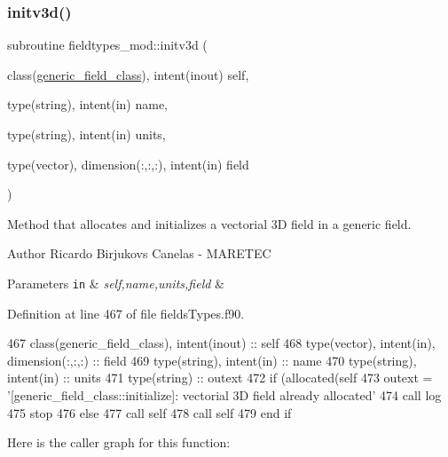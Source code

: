 \subsubsection{\texorpdfstring{initv3d()}{initv3d()}}
{\footnotesize\ttfamily subroutine fieldtypes\+\_\+mod\+::initv3d (\begin{DoxyParamCaption}\item[{class(\mbox{\hyperlink{structfieldtypes__mod_1_1generic__field__class}{generic\+\_\+field\+\_\+class}}), intent(inout)}]{self,  }\item[{type(string), intent(in)}]{name,  }\item[{type(string), intent(in)}]{units,  }\item[{type(vector), dimension(\+:,\+:,\+:), intent(in)}]{field }\end{DoxyParamCaption})\hspace{0.3cm}{\ttfamily [private]}}



Method that allocates and initializes a vectorial 3D field in a generic field. 

\begin{DoxyAuthor}{Author}
Ricardo Birjukovs Canelas -\/ M\+A\+R\+E\+T\+EC 
\end{DoxyAuthor}

\begin{DoxyParams}[1]{Parameters}
\mbox{\tt in}  & {\em self,name,units,field} & \\
\hline
\end{DoxyParams}


Definition at line 467 of file fields\+Types.\+f90.


\begin{DoxyCode}
467     \textcolor{keywordtype}{class}(generic\_field\_class), \textcolor{keywordtype}{intent(inout)} :: self
468     \textcolor{keywordtype}{type}(vector), \textcolor{keywordtype}{intent(in)}, \textcolor{keywordtype}{dimension(:,:,:)} :: field
469     \textcolor{keywordtype}{type}(string), \textcolor{keywordtype}{intent(in)} :: name
470     \textcolor{keywordtype}{type}(string), \textcolor{keywordtype}{intent(in)} :: units
471     \textcolor{keywordtype}{type}(string) :: outext
472     \textcolor{keywordflow}{if} (\textcolor{keyword}{allocated}(self%
473         outext = \textcolor{stringliteral}{'[generic\_field\_class::initialize]: vectorial 3D field already allocated'}
474         \textcolor{keyword}{call }log%
475         stop
476     \textcolor{keywordflow}{else}
477         \textcolor{keyword}{call }self%
478         \textcolor{keyword}{call }self%
479 \textcolor{keywordflow}{    end if}
\end{DoxyCode}
Here is the caller graph for this function\+:
\mbox{\label{namespacefieldtypes__mod_a08d665678bea0956a323d08863e164e5}} 
